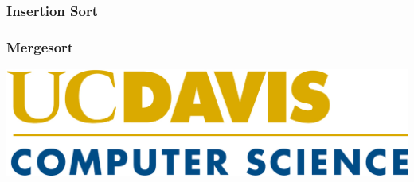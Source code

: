 \documentclass{article}
\begin{document}
\begin{mdframed}
\vspace{3em}
\end{mdframed}

\subsubsection{Insertion Sort}

\begin{mdframed}
\vspace{3em}
\end{mdframed}

\subsubsection{Mergesort}

\begin{mdframed}
\vspace{3em}
\end{mdframed}

\begin{center}
\includegraphics[scale=0.4]{UCD_CS_Logo}
\end{center}
\end{document}
